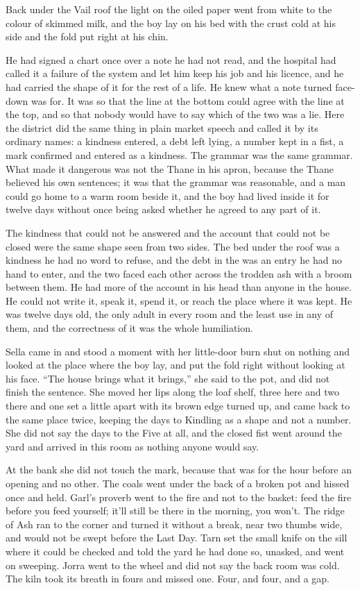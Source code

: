 \scenebreak

Back under the Vail roof the light on the oiled paper went from white to the colour of skimmed milk, and the boy lay on his bed with the crust cold at his side and the fold put right at his chin.

He had signed a chart once over a note he had not read, and the hospital had called it a failure of the system and let him keep his job and his licence, and he had carried the shape of it for the rest of a life. He knew what a note turned face-down was for. It was so that the line at the bottom could agree with the line at the top, and so that nobody would have to say which of the two was a lie. Here the district did the same thing in plain market speech and called it by its ordinary names: a kindness entered, a debt left lying, a number kept in a fist, a mark confirmed and entered as a kindness. The grammar was the same grammar. What made it dangerous was not the Thane in his apron, because the Thane believed his own sentences; it was that the grammar was reasonable, and a man could go home to a warm room beside it, and the boy had lived inside it for twelve days without once being asked whether he agreed to any part of it.

The kindness that could not be answered and the account that could not be closed were the same shape seen from two sides. The bed under the roof was a kindness he had no word to refuse, and the debt in the  was an entry he had no hand to enter, and the two faced each other across the trodden ash with a broom between them. He had more of the account in his head than anyone in the house. He could not write it, speak it, spend it, or reach the place where it was kept. He was twelve days old, the only adult in every room and the least use in any of them, and the correctness of it was the whole humiliation.

Sella came in and stood a moment with her little-door burn shut on nothing and looked at the place where the boy lay, and put the fold right without looking at his face. “The house brings what it brings,” she said to the pot, and did not finish the sentence. She moved her lips along the loaf shelf, three here and two there and one set a little apart with its brown edge turned up, and came back to the same place twice, keeping the days to Kindling as a shape and not a number. She did not say the days to the Five at all, and the closed fist went around the yard and arrived in this room as nothing anyone would say.

At the bank she did not touch the mark, because that was for the hour before an opening and no other. The coals went under the back of a broken pot and hissed once and held. Garl's proverb went to the fire and not to the basket: feed the fire before you feed yourself; it'll still be there in the morning, you won't. The ridge of Ash ran to the corner and turned it without a break, near two thumbs wide, and would not be swept before the Last Day. Tarn set the small knife on the sill where it could be checked and told the yard he had done so, unasked, and went on sweeping. Jorra went to the wheel and did not say the back room was cold. The kiln took its breath in fours and missed one. Four, and four, and a gap.

